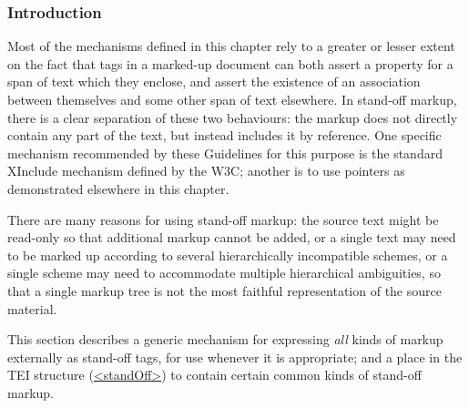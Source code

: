 \subsubsection[{Introduction}]{Introduction}\label{SASOin}\par
Most of the mechanisms defined in this chapter rely to a greater or lesser extent on the fact that tags in a marked-up document can both assert a property for a span of text which they enclose, and assert the existence of an association between themselves and some other span of text elsewhere. In stand-off markup, there is a clear separation of these two behaviours: the markup does not directly contain any part of the text, but instead includes it by reference. One specific mechanism recommended by these Guidelines for this purpose is the standard XInclude mechanism defined by the W3C; another is to use pointers as demonstrated elsewhere in this chapter. \par
There are many reasons for using stand-off markup: the source text might be read-only so that additional markup cannot be added, or a single text may need to be marked up according to several hierarchically incompatible schemes, or a single scheme may need to accommodate multiple hierarchical ambiguities, so that a single markup tree is not the most faithful representation of the source material.\par
This section describes a generic mechanism for expressing \textit{all} kinds of markup externally as stand-off tags, for use whenever it is appropriate; and a place in the TEI structure (\hyperref[TEI.standOff]{<standOff>}) to contain certain common kinds of stand-off markup.\par
